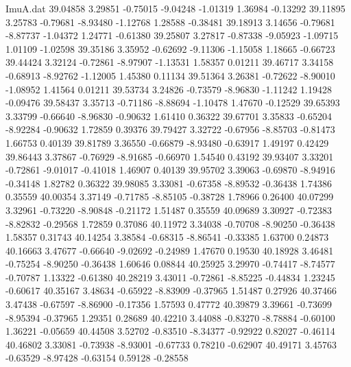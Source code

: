 \begin{filecontents}{ImuA.dat}
  39.04858    3.29851   -0.75015   -9.04248   -1.01319    1.36984   -0.13292
  39.11895    3.25783   -0.79681   -8.93480   -1.12768    1.28588   -0.38481
  39.18913    3.14656   -0.79681   -8.87737   -1.04372    1.24771   -0.61380
  39.25807    3.27817   -0.87338   -9.05923   -1.09715    1.01109   -1.02598
  39.35186    3.35952   -0.62692   -9.11306   -1.15058    1.18665   -0.66723
  39.44424    3.32124   -0.72861   -8.97907   -1.13531    1.58357    0.01211
  39.46717    3.34158   -0.68913   -8.92762   -1.12005    1.45380    0.11134
  39.51364    3.26381   -0.72622   -8.90010   -1.08952    1.41564    0.01211
  39.53734    3.24826   -0.73579   -8.96830   -1.11242    1.19428   -0.09476
  39.58437    3.35713   -0.71186   -8.88694   -1.10478    1.47670   -0.12529
  39.65393    3.33799   -0.66640   -8.96830   -0.90632    1.61410    0.36322
  39.67701    3.35833   -0.65204   -8.92284   -0.90632    1.72859    0.39376
  39.79427    3.32722   -0.67956   -8.85703   -0.81473    1.66753    0.40139
  39.81789    3.36550   -0.66879   -8.93480   -0.63917    1.49197    0.42429
  39.86443    3.37867   -0.76929   -8.91685   -0.66970    1.54540    0.43192
  39.93407    3.33201   -0.72861   -9.01017   -0.41018    1.46907    0.40139
  39.95702    3.39063   -0.69870   -8.94916   -0.34148    1.82782    0.36322
  39.98085    3.33081   -0.67358   -8.89532   -0.36438    1.74386    0.35559
  40.00354    3.37149   -0.71785   -8.85105   -0.38728    1.78966    0.26400
  40.07299    3.32961   -0.73220   -8.90848   -0.21172    1.51487    0.35559
  40.09689    3.30927   -0.72383   -8.82832   -0.29568    1.72859    0.37086
  40.11972    3.34038   -0.70708   -8.90250   -0.36438    1.58357    0.31743
  40.14254    3.38584   -0.68315   -8.86541   -0.33385    1.63700    0.24873
  40.16663    3.47677   -0.66640   -9.02692   -0.24989    1.47670    0.19530
  40.18928    3.46481   -0.75254   -8.90250   -0.36438    1.60646    0.08844
  40.25925    3.29970   -0.74417   -8.74577   -0.70787    1.13322   -0.61380
  40.28219    3.43011   -0.72861   -8.85225   -0.44834    1.23245   -0.60617
  40.35167    3.48634   -0.65922   -8.83909   -0.37965    1.51487    0.27926
  40.37466    3.47438   -0.67597   -8.86900   -0.17356    1.57593    0.47772
  40.39879    3.39661   -0.73699   -8.95394   -0.37965    1.29351    0.28689
  40.42210    3.44088   -0.83270   -8.78884   -0.60100    1.36221   -0.05659
  40.44508    3.52702   -0.83510   -8.34377   -0.92922    0.82027   -0.46114
  40.46802    3.33081   -0.73938   -8.93001   -0.67733    0.78210   -0.62907
  40.49171    3.45763   -0.63529   -8.97428   -0.63154    0.59128   -0.28558

\end{filecontents}
